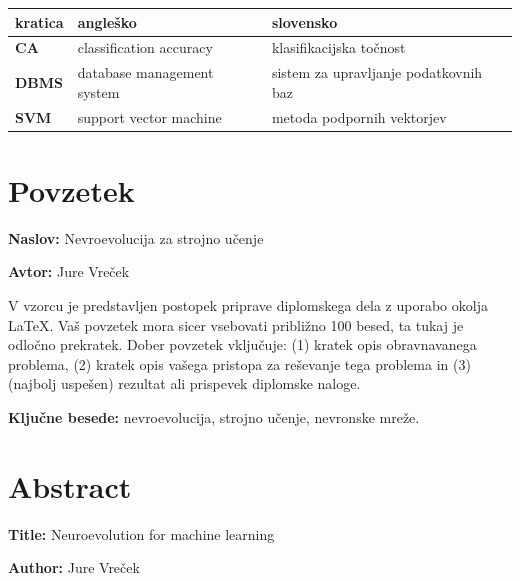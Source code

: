 \documentclass[a4paper,12pt,openright]{book}
\newcommand{\ttitle}{Nevroevolucija za strojno učenje}
\newcommand{\ttitleEn}{Neuroevolution for machine learning}
\newcommand{\tauthor}{Jure Vreček}
\newcommand{\tkeywords}{nevroevolucija, strojno učenje, nevronske mreže}
\newcommand{\clearemptydoublepage}{\newpage{\pagestyle{empty}\cleardoublepage}}
\begin{document}
    \noindent\begin{tabular}{p{}|p{}|p{}}    %
    {\bf kratica}
                 & {\bf angleško}             & {\bf slovensko}                       \\ \hline
                 {\bf CA}   & classification accuracy    & klasifikacijska točnost \\
                 {\bf DBMS} & database management system & sistem za upravljanje podatkovnih baz \\
                 {\bf SVM}  & support vector machine     & metoda podpornih vektorjev            \\
    \end{tabular}


    \clearemptydoublepage

    \chapter*{Povzetek}

    \noindent\textbf{Naslov:} \ttitle
    \bigskip

    \noindent\textbf{Avtor:} \tauthor
    \bigskip

    \noindent V vzorcu je predstavljen postopek priprave diplomskega dela z uporabo okolja \LaTeX. Vaš povzetek mora sicer vsebovati približno 100 besed, ta tukaj je odločno prekratek.
    Dober povzetek vključuje: (1) kratek opis obravnavanega problema, (2) kratek opis vašega pristopa za reševanje tega problema in (3) (najbolj uspešen) rezultat ali prispevek diplomske naloge.

    \bigskip

    \noindent\textbf{Ključne besede:} \tkeywords.
    \clearemptydoublepage

    \chapter*{Abstract}

    \noindent\textbf{Title:} \ttitleEn
    \bigskip

    \noindent\textbf{Author:} \tauthor
    \bigskip
\end{document}

